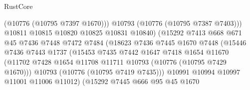 \begin{lexlean}{RustCore}
\begin{coremodule}
                                        (@10776 (@10795 @7397 @1670)))
                                      @10793
                                      (@10776 (@10795 @7387 @7403)))
                                    @10811
                                    @10815
                                    @10820
                                    @10825
                                    @10831
                                    @10840)
                                  (@15292
                                    @7413
                                    @668
                                    @671
                                    @45
                                    @7436
                                    @7448
                                    @7472
                                    @7484
                                    (@18623
                                      @7436
                                      @7445
                                      @1670
                                      @7448
                                      (@15446
                                        @7436
                                        @7443
                                        @1737
                                        (@15453
                                          @7435
                                          @7442
                                          @1647
                                          @7418
                                          @1654
                                          @11670
                                          (@11702
                                            @7428
                                            @1654
                                            @11708
                                            @11711
                                            @10793
                                            (@10776 (@10795 @7429 @1670)))
                                          @10793
                                          (@10776 (@10795 @7419 @7435)))
                                        @10991
                                        @10994
                                        @10997
                                        @11001
                                        @11006
                                        @11012)
                                      (@15292
                                        @7445
                                        @666
                                        @95
                                        @45
                                        @1670

\end{coremodule}
\end{lexlean}
